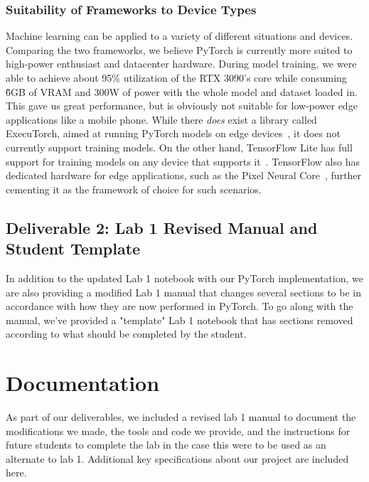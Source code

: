 \documentclass[letterpaper,twocolumn,10pt]{article}
\begin{document}
\subsubsection{Suitability of Frameworks to Device Types}
Machine learning can be applied to a variety of different situations and devices. Comparing the two frameworks, we believe PyTorch is currently more suited to high-power enthusiast and datacenter hardware. During model training, we were able to achieve about 95\% utilization of the RTX 3090's core while consuming \~6GB of VRAM and 300W of power with the whole model and dataset loaded in. This gave us great performance, but is obviously not suitable for low-power edge applications like a mobile phone. While there \textit{does} exist a library called ExecuTorch, aimed at running PyTorch models on edge devices~\cite{executorch}, it does not currently support training models. On the other hand, TensorFlow Lite has full support for training models on any device that supports it~\cite{tflite}. TensorFlow also has dedicated hardware for edge applications, such as the Pixel Neural Core~\cite{pixel}, further cementing it as the framework of choice for such scenarios.

\subsection{Deliverable 2: Lab 1 Revised Manual and Student Template}
In addition to the updated Lab 1 notebook with our PyTorch implementation, we are also providing a modified Lab 1 manual that changes several sections to be in accordance with how they are now performed in PyTorch. To go along with the manual, we've provided a "template" Lab 1 notebook that has sections removed according to what should be completed by the student.

\section{Documentation}

As part of our deliverables, we included a revised lab 1 manual to document the modifications we made, the tools and code we provide, and the instructions for future students to complete the lab in the case this were to be used as an alternate to lab 1. Additional key specifications about our project are included here.

\newpage
\end{document}
